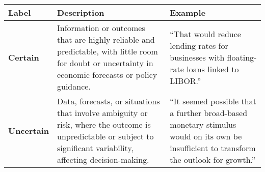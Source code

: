 \begin{table*}
    \caption{}
    \vspace{1em}
    \begin{tabular}{p{}p{}p{}}
    \toprule
    \textbf{Label} & \textbf{Description} & \textbf{Example}\\
    \midrule
    \textbf{Certain} & Information or outcomes that are highly reliable and predictable, with little room for doubt or uncertainty in economic forecasts or policy guidance. & “That would reduce lending rates for businesses with floating-rate loans linked to LIBOR.” \\
    \midrule
    \textbf{Uncertain} & Data, forecasts, or situations that involve ambiguity or risk, where the outcome is unpredictable or subject to significant variability, affecting decision-making.  & “It seemed possible that a further broad-based monetary stimulus would on its own be insufficient to transform the outlook for growth.” \\
    \bottomrule
    \end{tabular}
    \label{tb:boe_certainty_guide}
\end{table*}
    
    
    